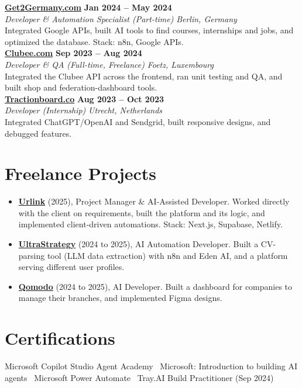 \documentclass[a4paper,10pt]{article}
\newcommand{\role}[4]{%
 \textbf{#1} \hfill \textbf{#2}\\[1pt]%
 \textit{#3} \hfill \textit{#4}\\[2pt]%
}
\begin{document}
\role{\href{https://get2germany.com}{Get2Germany.com}}{Jan 2024 -- May 2024}{Developer \& Automation Specialist (Part-time)}{Berlin, Germany}
Integrated Google APIs, built AI tools to find courses, internships and jobs, and optimized the database. Stack: n8n, Google APIs.\\[1pt]

\role{\href{https://clubee.com}{Clubee.com}}{Sep 2023 -- Aug 2024}{Developer \& QA (Full-time, Freelance)}{Foetz, Luxembourg}
Integrated the Clubee API across the frontend, ran unit testing and QA, and built shop and federation-dashboard tools.\\[1pt]

\role{\href{https://tractionboard.co}{Tractionboard.co}}{Aug 2023 -- Oct 2023}{Developer (Internship)}{Utrecht, Netherlands}
Integrated ChatGPT/OpenAI and Sendgrid, built responsive designs, and debugged features.

\section{Freelance Projects}
\begin{itemize}
 \item \textbf{\href{https://smarturlink.com/}{Urlink}} (2025), Project Manager \& AI-Assisted Developer. Worked directly with the client on requirements, built the platform and its logic, and implemented client-driven automations. Stack: Next.js, Supabase, Netlify.
 \item \textbf{\href{https://ultrastrategy.com}{UltraStrategy}} (2024 to 2025), AI Automation Developer. Built a CV-parsing tool (LLM data extraction) with n8n and Eden AI, and a platform serving different user profiles.
 \item \textbf{\href{https://www.qomodo.me/}{Qomodo}} (2024 to 2025), AI Developer. Built a dashboard for companies to manage their branches, and implemented Figma designs.
\end{itemize}

\section{Certifications}
Microsoft Copilot Studio Agent Academy \textbullet\ Microsoft: Introduction to building AI agents \textbullet\ Microsoft Power Automate \textbullet\ Tray.AI Build Practitioner (Sep 2024)

\end{document}
